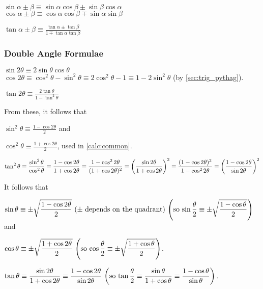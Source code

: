 \documentclass[a4paper,11pt]{article}
\begin{document}
    $\sin \alpha \pm \beta \equiv
       \sin \alpha \cos \beta \pm \sin \beta \cos \alpha$
    \\$\cos \alpha \pm \beta \equiv
       \cos \alpha \cos \beta \mp \sin \alpha \sin \beta$

    $\displaystyle \tan \alpha \pm \beta \equiv
        \frac{\tan \alpha \pm \tan \beta}{1 \mp \tan \alpha \tan \beta}$

    \subsubsection{Double Angle Formulae} \label{sec:trig_double_angle}

    $\sin 2\theta \equiv
       2\sin \theta \cos \theta$
    \\$\cos 2\theta \equiv
       \cos^2 \theta - \sin^2 \theta \equiv
       2\cos^2 \theta - 1 \equiv 1 - 2\sin^2 \theta$ (by \ref{sec:trig_pythag}).

    $\displaystyle \tan 2\theta \equiv
        \frac{2\tan \theta}{1 - \tan^2 \theta}$

    From these, it follows that

    $\displaystyle \sin^2 \theta \equiv
        \frac{1 - \cos 2 \theta} 2$ and

    $\displaystyle \cos^2 \theta \equiv
        \frac{1 + \cos 2 \theta} 2$, used in \ref{calc:common}.

    $\displaystyle \tan^2 \theta \equiv \frac{\sin^2 \theta}{\cos^2 \theta}
        \equiv \frac{1 - \cos 2 \theta}{1 + \cos 2 \theta}
        \equiv \frac{1 - \cos^2 2 \theta}{(1 + \cos 2 \theta)^2}
        \equiv \pqty{\frac{\sin 2 \theta}{1 + \cos 2 \theta}}^2
        \equiv \frac{(1 - \cos 2 \theta)^2}{1 - \cos^2 2 \theta}
        \equiv \pqty{\frac{1 - \cos 2 \theta}{\sin 2 \theta}}^2$

    It follows that

    $\displaystyle \sin \theta \equiv
        \pm\sqrt{\frac{1 - \cos 2 \theta} 2}
     \ \pqty{\text{$\pm$ depends on the quadrant}}
     \ \pqty{\text{so $\displaystyle \sin \frac \theta 2 \equiv
        \pm\sqrt{\frac{1 - \cos \theta} 2}$}}$ and

    $\displaystyle \cos \theta \equiv
        \pm\sqrt{\frac{1 + \cos 2 \theta} 2}\ \pqty{\text{so
    $\cos \frac \theta 2 \equiv
        \pm\sqrt{\frac{1 + \cos \theta} 2}$}}$.

    $\displaystyle \tan \theta
        \equiv \frac{\sin 2 \theta}{1 + \cos 2 \theta}
        \equiv \frac{1 - \cos 2 \theta}{\sin 2 \theta}
     \ \pqty{\text{so $\tan \frac \theta 2
        \equiv \frac{\sin \theta}{1 + \cos \theta}
        \equiv \frac{1 - \cos \theta}{\sin \theta}$}}$.
\end{document}
